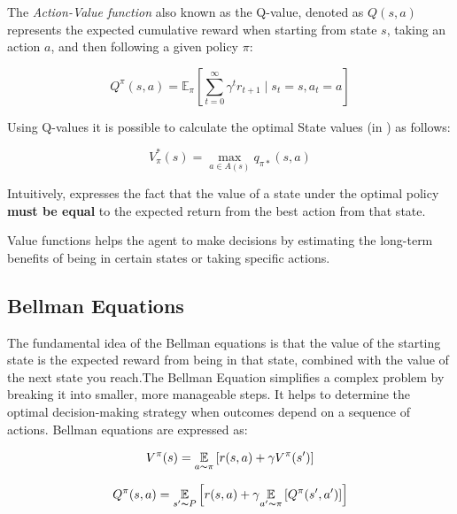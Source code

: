 The \emph{Action-Value function} also known as the Q-value, denoted as $Q(s,a)$ represents the expected cumulative reward when starting from state $s$, taking an action $a$, and then following a given policy $\pi$:

\begin{equation}
    Q^\pi(s, a) = \mathbb{E}_\pi \left[ \sum_{t=0}^{\infty} \gamma^t r_{t+1} \mid s_t = s, a_t = a \right]
    \label{eq: q_func_suboptimal}
\end{equation}

Using Q-values it is possible to calculate the optimal State values (in ) as follows:

\begin{equation}
    \label{eq:v_func_optimal}
    V_{\pi}^{*}(s) = \max\limits_{a \in A(s)} q_{\pi*}(s,a)
\end{equation}

Intuitively,  expresses the fact that the value of a state under the optimal policy \textbf{must be equal} to the expected return from the best action from that state.

Value functions helps the agent to make decisions by estimating the long-term benefits of being in certain states or taking specific actions.

\subsection{Bellman Equations}
The fundamental idea of the Bellman equations is that the value of the starting state is the expected reward from being in that state, combined with the value of the next state you reach.The Bellman Equation simplifies a complex problem by breaking it into smaller, more manageable steps. It helps to determine the optimal decision-making strategy when outcomes depend on a sequence of actions. Bellman equations are expressed as:

\begin{equation*}
    V^\pi(s) = \underset{a \thicksim \pi}{\mathbb{E}} \left[ r(s,a) + \gamma V^\pi (s^{\prime}) \right]
\end{equation*}

\begin{equation}
    \label{eq:q-value-bellman-equation}
    Q^\pi(s,a) =\underset{s^{\prime}\thicksim P}{\mathbb{E}} \left[ r(s,a) + \gamma \underset{a^{\prime}\thicksim \pi}{\mathbb{E}}\left[Q^{\pi}(s^{\prime},a^{\prime})\right]\right]
\end{equation}

